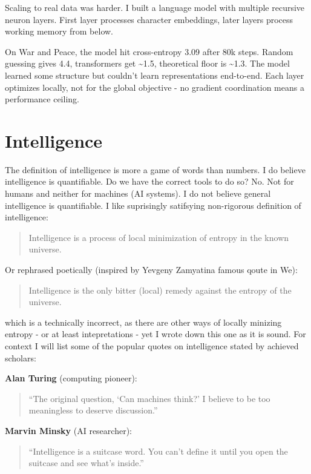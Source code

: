 \documentclass[11pt]{article}
\begin{document}
Scaling to real data was harder. I built a language model with multiple recursive neuron layers. First layer processes character embeddings, later layers process working memory from below.

On War and Peace, the model hit cross-entropy 3.09 after 80k steps. Random guessing gives 4.4, transformers get \textasciitilde{}1.5, theoretical floor is \textasciitilde{}1.3. The model learned some structure but couldn't learn representations end-to-end. Each layer optimizes locally, not for the global objective - no gradient coordination means a performance ceiling.

\section*{Intelligence}

The definition of intelligence is more a game of words than numbers. I do believe intelligence is quantifiable. Do we have the correct tools to do so? No. Not for humans and neither for machines (AI systems).  I do not believe general intelligence is quantifiable. I like suprisingly satifsying non-rigorous definition of intelligence:

\begin{quote}
Intelligence is a process of local minimization of entropy in the known universe.
\end{quote}

Or rephrased poetically (inspired by Yevgeny Zamyatina famous qoute in We):

\begin{quote}
Intelligence is the only bitter (local) remedy against the entropy of the universe.
\end{quote}

which is a technically incorrect, as there are other ways of locally minizing entropy - or at least intepretations - yet I wrote down this one as it is sound. For context I will list some of the popular quotes on intelligence stated by achieved scholars:

\textbf{Alan Turing} (computing pioneer):
\begin{quote}
``The original question, `Can machines think?' I believe to be too meaningless to deserve discussion.''
\end{quote}

\textbf{Marvin Minsky} (AI researcher):
\begin{quote}
``Intelligence is a suitcase word. You can't define it until you open the suitcase and see what's inside.''
\end{quote}
\end{document}
